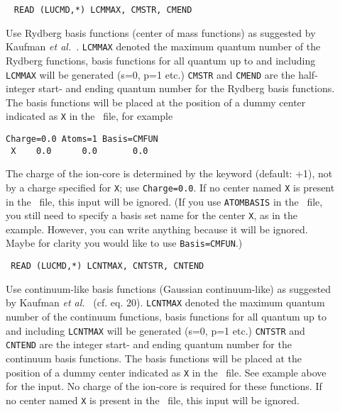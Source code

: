 \begin{description}
\item[]\verb| |\newline
\verb|READ (LUCMD,*) LCMMAX, CMSTR, CMEND|

Use Rydberg basis functions
(center of mass functions) as suggested by
Kaufman {\it et al.\/}~\cite{kkwbmjjpbamop22}. \verb|LCMMAX| denoted
the maximum quantum number of the Rydberg functions, basis functions
for all quantum up to and including \verb|LCMMAX| will be generated
(s=0, p=1 etc.) \verb|CMSTR| and \verb|CMEND| are the half-integer
start- and ending quantum number for the Rydberg basis functions. The
basis functions will be placed at the position of a dummy center
indicated as \verb|X| in the \molinp\ file, for example
\begin{verbatim}
Charge=0.0 Atoms=1 Basis=CMFUN
 X    0.0      0.0       0.0
\end{verbatim}
The charge of
the ion-core is determined by the keyword  (default: +1),
not by a charge specified for \verb|X|; use \verb|Charge=0.0|.
If no center named \verb|X| is present in the \molinp\ file,
this input will be ignored.
(If you use \verb|ATOMBASIS| in the \molinp\ file, you still need to specify
a basis set name for the center \verb|X|, as in the example. However, you can write anything
because it will be ignored. Maybe for clarity you would like to use \verb|Basis=CMFUN|.)


\item[]\verb| |\newline
\verb|READ (LUCMD,*) LCNTMAX, CNTSTR, CNTEND|

%
%
Use continuum-like basis functions
(Gaussian continuum-like) as suggested by
Kaufman {\it et al.\/}~\cite{kkwbmjjpbamop22} (cf. eq. 20). \verb|LCNTMAX| denoted
the maximum quantum number of the continuum functions, basis functions
for all quantum up to and including \verb|LCNTMAX| will be generated
(s=0, p=1 etc.) \verb|CNTSTR| and \verb|CNTEND| are the integer
start- and ending quantum number for the continuum basis functions. The
basis functions will be placed at the position of a dummy center
indicated as \verb|X| in the \molinp\ file.
See example above for the  input.
No charge of the ion-core is required for these functions.
If no center named \verb|X| is present in the \molinp\ file,
this input will be ignored.


\end{description}
